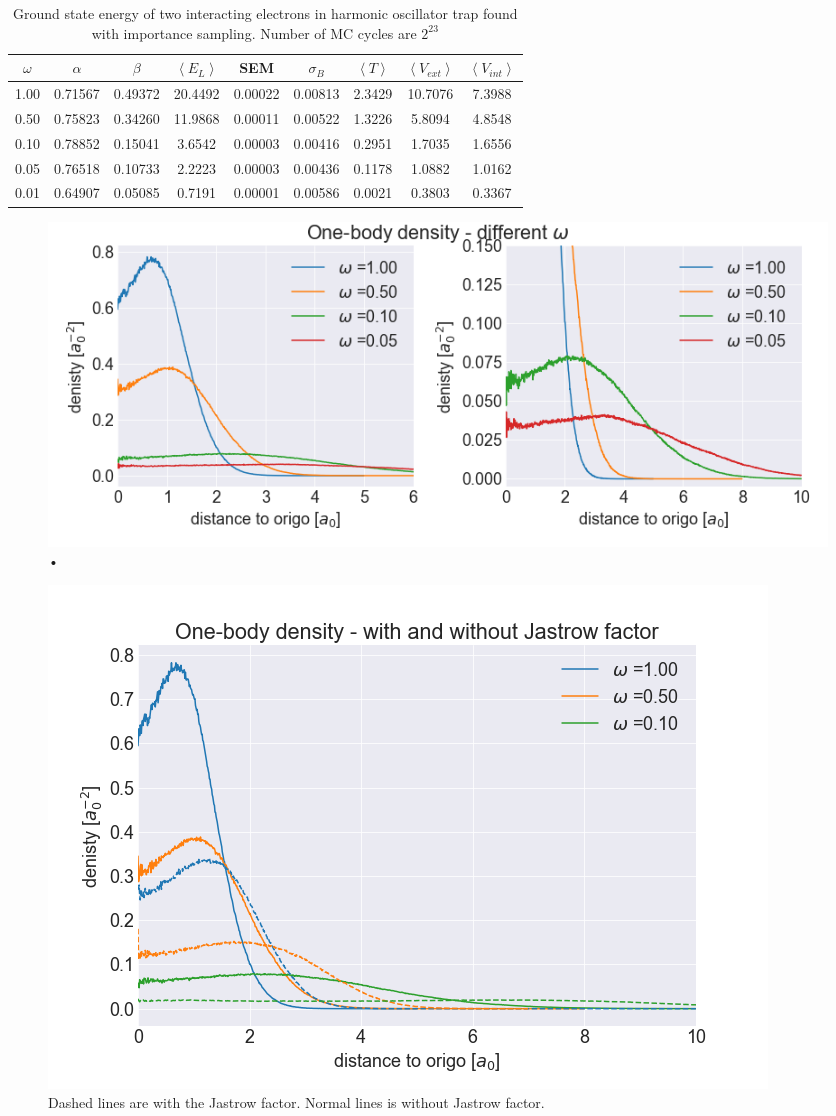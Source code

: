 \begin{table}[H]\caption{Ground state energy of two interacting electrons in harmonic oscillator trap found with importance sampling. Number of MC cycles are $2^{23}$}\label{tab:ground_state_energy_importance_interaction_6p}
\center
\begin{tabular}{c|cccccccc}
$\omega$ & $\alpha$ & $\beta$ & $\left< E_L \right>$ & SEM & $\sigma_B$ &  $\left< T \right>$  & $\left< V_{ext}\right>$ & $\left<V_{int} \right>$  \\ \hline
1.00 & 0.71567 & 0.49372 & 20.4492 & 0.00022 & 0.00813 & 2.3429 & 10.7076 & 7.3988\\
0.50 & 0.75823 & 0.34260 & 11.9868 & 0.00011 & 0.00522 & 1.3226 & 5.8094 & 4.8548\\
0.10 & 0.78852 & 0.15041 & 3.6542 & 0.00003 & 0.00416 & 0.2951 & 1.7035 & 1.6556\\
0.05 & 0.76518 & 0.10733 & 2.2223 & 0.00003 & 0.00436 &  0.1178 & 1.0882 & 1.0162\\
0.01 & 0.64907 & 0.05085 & 0.7191 & 0.00001 & 0.00586 & 0.0021 & 0.3803 & 0.3367\\
\end{tabular}
\end{table}

\begin{figure}[H]
\center
\includegraphics[width=0.85\linewidth]{../Results/one_body_density_no_interaction_6p}\caption{•}\label{fig:one_body_density_no_interaction_6p}
\end{figure}

\begin{figure}[H]
\center
\includegraphics[width=0.70\linewidth]{../Results/one_body_density_interaction_6p}\caption{Dashed lines are with the Jastrow factor. Normal lines is without Jastrow factor. }\label{fig:one_body_density_interaction_6p}
\end{figure}



